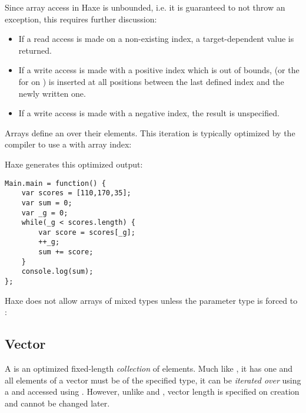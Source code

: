 
Since array access in Haxe is unbounded, i.e. it is guaranteed to not throw an exception, this requires further discussion:

\begin{itemize}
	\item If a read access is made on a non-existing index, a target-dependent value is returned.
	\item If a write access is made with a positive index which is out of bounds,  (or the  for  on ) is inserted at all positions between the last defined index and the newly written one.
	\item If a write access is made with a negative index, the result is unspecified.
\end{itemize}

Arrays define an  over their elements. This iteration is typically optimized by the compiler to use a  with array index:


Haxe generates this optimized  output:

\begin{lstlisting}
Main.main = function() {
	var scores = [110,170,35];
	var sum = 0;
	var _g = 0;
	while(_g < scores.length) {
		var score = scores[_g];
		++_g;
		sum += score;
	}
	console.log(sum);
};
\end{lstlisting}

Haxe does not allow arrays of mixed types unless the parameter type is forced to :




\subsection{Vector}
\label{std-vector}

A  is an optimized fixed-length \emph{collection} of elements. Much like , it has one  and all elements of a vector must be of the specified type, it can be \emph{iterated over} using a  and accessed using . However, unlike  and , vector length is specified on creation and cannot be changed later.

